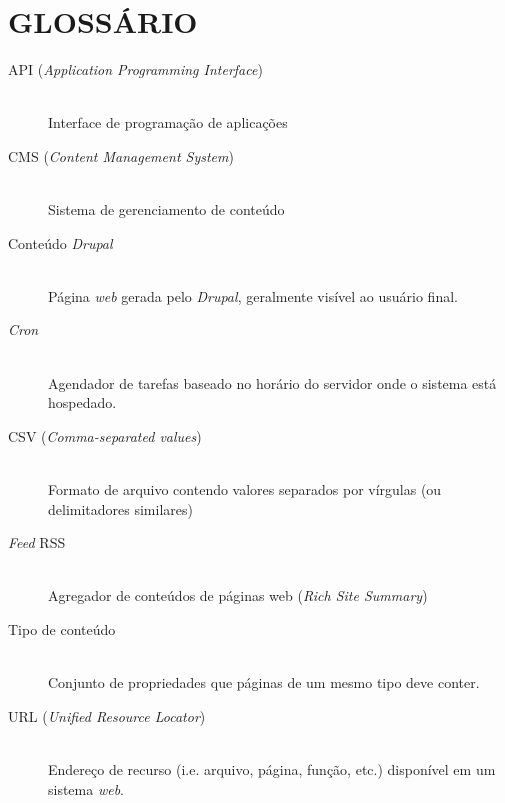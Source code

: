\documentclass[a4paper]{article}
\begin{document}
\section{GLOSSÁRIO}
\begin{description}
\item[API (\textit{Application Programming Interface})] \hfill \\ Interface de programação de aplicações
\item[CMS (\textit{Content Management System})] \hfill \\ Sistema de gerenciamento de conteúdo
\item[Conteúdo \textit{Drupal}] \hfill \\ Página \textit{web} gerada pelo \textit{Drupal}, geralmente visível ao usuário final.
\item[\textit{Cron}] \hfill \\ Agendador de tarefas baseado no horário do servidor onde o sistema está hospedado.
\item[CSV (\textit{Comma-separated values})] \hfill \\ Formato de arquivo contendo valores separados por vírgulas (ou delimitadores similares)
\item[\textit{Feed} RSS] \hfill \\ Agregador de conteúdos de páginas web (\textit{Rich Site Summary})
\item[Tipo de conteúdo] \hfill \\ Conjunto de propriedades que páginas de um mesmo tipo deve conter.
\item[URL (\textit{Unified Resource Locator})] \hfill \\ Endereço de recurso (i.e. arquivo, página, função, etc.) disponível em um sistema \textit{web}.
\end{description}
\end{document}
